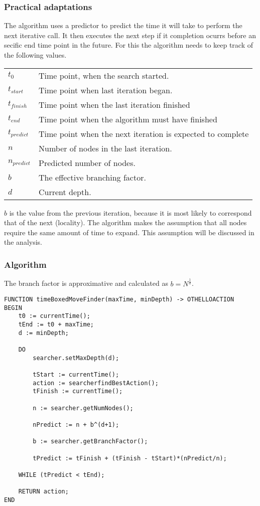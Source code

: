 \documentclass[a4paper,11pt]{article}
\begin{document}
\subsubsection{Practical adaptations}
The algorithm uses a predictor to predict the time it will take to perform the next iterative call. It then executes the next step if it completion ocurrs before an secific end time point in the future. For this the algorithm needs to keep track of the following values.

\begin{tabular}{l l}
$t_0$ & Time point, when the search started. \\
$t_{start}$ & Time point when last iteration began. \\
$t_{finish}$ & Time point when the last iteration finished \\
$t_{end}$ & Time point when the algorithm must have finished \\
$t_{predict}$ & Time point when the next iteration is expected to complete \\
$n$ & Number of nodes in the last iteration. \\
$n_{predict}$ & Predicted number of nodes. \\
$b$ & The effective branching factor. \\
$d$ & Current depth. \\
\end{tabular}

$b$ is the value from the previous iteration, because it is most likely to correspond that of the next (locality). The algorithm makes the assumption that all nodes require the same amount of time to expand. This assumption will be discussed in the analysis.

\subsubsection{Algorithm}
The branch factor is approximative and calculated as $b = N^{\frac{1}{d}}$.

\begin{lstlisting}
FUNCTION timeBoxedMoveFinder(maxTime, minDepth) -> OTHELLOACTION
BEGIN
	t0 := currentTime();
	tEnd := t0 + maxTime;
	d := minDepth;
	
	DO
		searcher.setMaxDepth(d);
		
		tStart := currentTime();
		action := searcherfindBestAction();
		tFinish := currentTime();
		
		n := searcher.getNumNodes();
		
		nPredict := n + b^(d+1);
		
		b := searcher.getBranchFactor();
		
		tPredict := tFinish + (tFinish - tStart)*(nPredict/n);
		
	WHILE (tPredict < tEnd);
	
	RETURN action;
END
\end{lstlisting}
\end{document}
